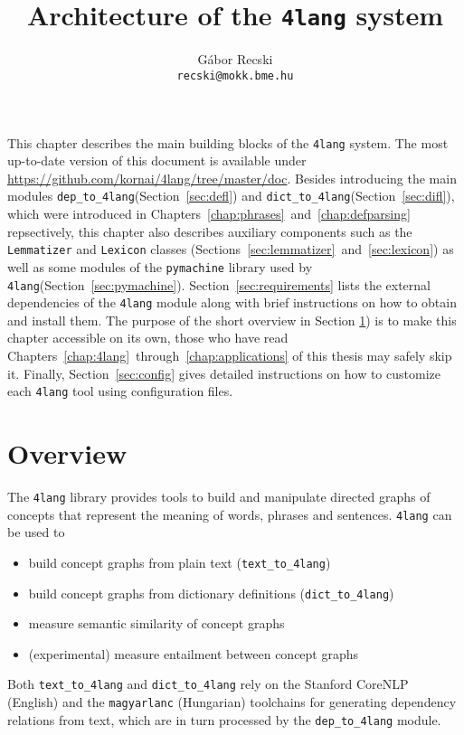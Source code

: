 \documentclass{article}
\title{Architecture of the \texttt{4lang} system}
\author{G\'abor Recski \\ \texttt{recski@mokk.bme.hu}}
\newcommand{\defl}{\texttt{dep\_to\_4lang}\xspace}
\newcommand{\difl}{\texttt{dict\_to\_4lang}\xspace}
\newcommand{\tfl}{\texttt{text\_to\_4lang}\xspace}
\newcommand{\fl}{\texttt{4lang}\xspace}
\begin{document}
\maketitle


This chapter describes the main building blocks of the \texttt{4lang} system.
The most up-to-date version of this document is available under
\url{https://github.com/kornai/4lang/tree/master/doc}. Besides introducing the
main modules \defl (Section~\ref{sec:defl}) and \difl (Section~\ref{sec:difl}),
which were introduced in Chapters~\ref{chap:phrases}~and~\ref{chap:defparsing}
repsectively, this chapter also describes auxiliary components
such as the \texttt{Lemmatizer} and \texttt{Lexicon} classes
(Sections~\ref{sec:lemmatizer}~and~\ref{sec:lexicon}) as well as some modules of
the \texttt{pymachine} library used by \fl (Section~\ref{sec:pymachine}).
Section~\ref{sec:requirements} lists the external dependencies of the \fl
module along with brief instructions on how to obtain and install them.
The purpose of the short overview in Section \ref{sec:overview}) is to make
this chapter accessible on its own, those who have read
Chapters~\ref{chap:4lang}~through~\ref{chap:applications} of this thesis may
safely skip it.
Finally, Section~\ref{sec:config} gives detailed instructions on how to
customize each \fl tool using configuration files.

\section{Overview}
\label{sec:overview}

The \texttt{4lang} library provides tools to build and manipulate directed
graphs of concepts that represent the meaning of words, phrases and sentences.
\texttt{4lang} can be used to
\begin{itemize}
    \item build concept graphs from plain text (\tfl)
    \item build concept graphs from dictionary definitions (\difl)
    \item measure semantic similarity of concept graphs
    \item (experimental) measure entailment between concept graphs
\end{itemize}
Both \tfl and \difl rely on the Stanford CoreNLP (English) and the
\texttt{magyarlanc} (Hungarian) toolchains for generating dependency relations
from text, which are in turn processed by the \defl module.
\end{document}
